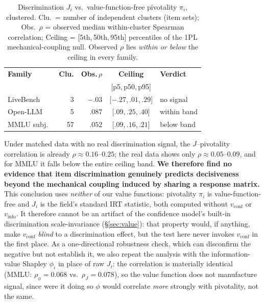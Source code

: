 \documentclass[conference]{IEEEtran}
\begin{document}
\begin{table}[t]
\centering
\caption{Discrimination $J_i$ vs.\ value-function-free pivotality $\pi_i$, clustered. Clu.\ = number of independent clusters (item sets); Obs.\ $\rho$ = observed median within-cluster Spearman correlation; Ceiling = [5th,\,50th,\,95th] percentiles of the 1PL mechanical-coupling null. Observed $\rho$ lies \emph{within or below} the ceiling in every family.}
\label{tab:extval}
\footnotesize
\setlength{\tabcolsep}{4pt}
\begin{tabular}{@{}lrrcl@{}}
\toprule
\textbf{Family} & \textbf{Clu.} & \textbf{Obs.}\,$\rho$ & \textbf{Ceiling} & \textbf{Verdict} \\
 & & & {\scriptsize[p5,\,p50,\,p95]} & \\
\midrule
LiveBench & 3 & $-.03$ & [$-.27$,\,$.01$,\,$.29$] & no signal \\
Open-LLM & 5 & $.087$ & [$.09$,\,$.25$,\,$.40$] & within band \\
MMLU subj.\ & 57 & $.052$ & [$.09$,\,$.16$,\,$.21$] & below band \\
\bottomrule
\end{tabular}
\end{table}

Under matched data with no real discrimination signal, the $J$--pivotality correlation is already $\rho\approx0.16$--$0.25$; the real data shows only $\rho\approx0.05$--$0.09$, and for MMLU it falls below the entire ceiling band.
\textbf{We therefore find no evidence that item discrimination genuinely predicts decisiveness beyond the mechanical coupling induced by sharing a response matrix.}
This conclusion uses \emph{neither} of our value functions: pivotality $\pi_i$ is value-function-free and $J_i$ is the field's standard IRT statistic, both computed without $v_{\text{conf}}$ or $v_{\text{info}}$.
It therefore cannot be an artifact of the confidence model's built-in discrimination scale-invariance (\S\ref{sec:value}): that property would, if anything, make $v_{\text{conf}}$ \emph{blind} to a discrimination effect, but the test here never invokes $v_{\text{conf}}$ in the first place.
As a one-directional robustness check, which can disconfirm the negative but not establish it, we also repeat the analysis with the information-value Shapley $\phi_i$ in place of raw $J_i$: the correlation is materially identical (MMLU: $\rho_\phi=0.068$ vs.\ $\rho_J=0.078$), so the value function does not manufacture signal, since were it doing so $\phi$ would correlate \emph{more} strongly with pivotality, not the same.
\end{document}
